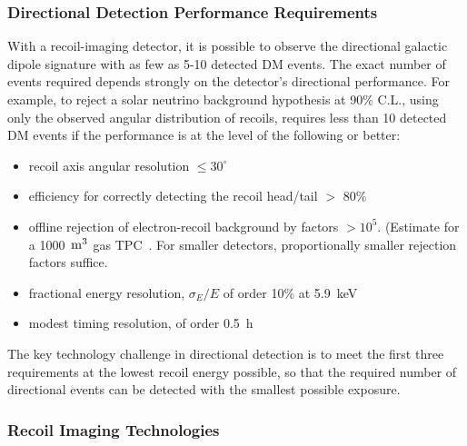 \subsubsection{Directional Detection Performance Requirements}
 
With a recoil-imaging detector, it is possible to observe the directional galactic dipole signature with as few as 5-10 detected DM events. The exact number of events required depends strongly on the detector’s directional performance. For example, to reject a solar neutrino background hypothesis at 90\% C.L., using only the observed angular distribution of recoils, requires less than 10 detected DM events if the performance is at the level of the following or better:

\begin{itemize}
\item recoil axis angular resolution $\leq 30^\circ$ 
\item efficiency for correctly detecting the recoil head/tail $>$ 80\%
\item offline rejection of electron-recoil background by factors $>10^5$. (Estimate for a 1000~${\rm m}^3$ gas TPC~\cite{Vahsen:2020pzb}. For smaller detectors, proportionally smaller rejection factors suffice.
\item fractional energy resolution, $\sigma_E/E$ of order 10\% at 5.9~keV
\item modest timing resolution, of order 0.5~h
\end{itemize}

The key technology challenge in directional detection is to meet the first three requirements at the lowest recoil energy possible, so that the required number of directional events can be detected with the smallest possible exposure.

\subsubsection{Recoil Imaging Technologies}
 

